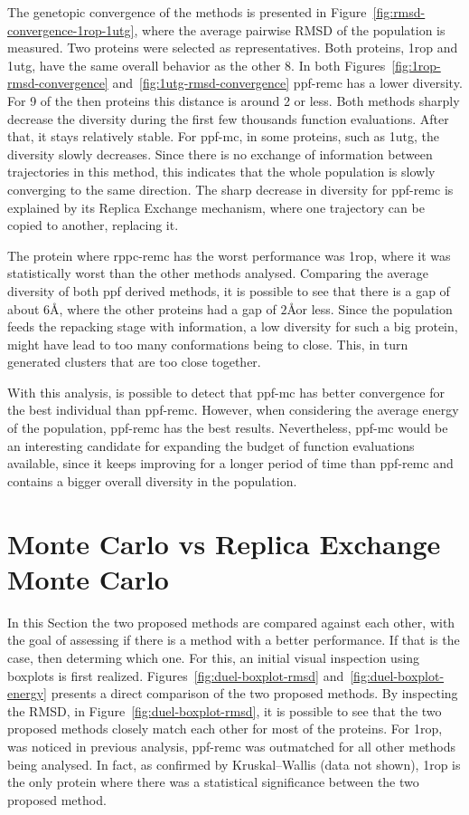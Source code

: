 The genetopic convergence of the methods is presented in
Figure~\ref{fig:rmsd-convergence-1rop-1utg}, where the average pairwise RMSD of
the population is measured. Two proteins were selected as representatives.
Both proteins, 1rop and 1utg, have the same overall behavior as the other 8.
In both Figures~\ref{fig:1rop-rmsd-convergence}
and~\ref{fig:1utg-rmsd-convergence} ppf-remc has a lower diversity. For 9 of
the then proteins this distance is around 2 or less. Both methods sharply
decrease the diversity during the first few thousands function evaluations.
After that, it stays relatively stable. For ppf-mc, in some proteins, such as
1utg, the diversity slowly decreases. Since there is no exchange of information
between trajectories in this method, this indicates that the whole population
is slowly converging to the same direction. The sharp decrease in diversity for
ppf-remc is explained by its Replica Exchange mechanism, where one trajectory
can be copied to another, replacing it.

The protein where rppc-remc has the worst performance was 1rop, where it was
statistically worst than the other methods analysed. Comparing the average
diversity of both ppf derived methods, it is possible to see that there is a
gap of about $6$\AA, where the other proteins had a gap of $2$\AA  or less.
Since the population feeds the repacking stage with information, a low diversity
for such a big protein, might have lead to too many conformations being to close.
This, in turn generated clusters that are too close together.

With this analysis, is possible to detect that ppf-mc has better
convergence for the best individual than ppf-remc. However, when considering
the average energy of the population, ppf-remc has the best results.
Nevertheless, ppf-mc would be an interesting candidate for expanding the
budget of function evaluations available, since it keeps improving for a
longer period of time than ppf-remc and contains a bigger overall diversity in
the population.

\section{Monte Carlo vs Replica Exchange Monte Carlo}
\label{sec:methods-duel}

In this Section the two proposed methods are compared against each other, with
the goal of assessing if there is a method with a better performance. If that is
the case, then determing which one. For this, an initial visual inspection
using boxplots is first realized. Figures~\ref{fig:duel-boxplot-rmsd}
and~\ref{fig:duel-boxplot-energy} presents a direct comparison of the two
proposed methods. By inspecting the RMSD, in Figure~\ref{fig:duel-boxplot-rmsd},
it is possible to see that the two proposed methods closely match each other for
most of the proteins. For 1rop, was noticed in previous analysis, ppf-remc was
outmatched for all other methods being analysed. In fact, as confirmed by
Kruskal–Wallis (data not shown), 1rop is the only protein where there was
a statistical significance between the two proposed method.

